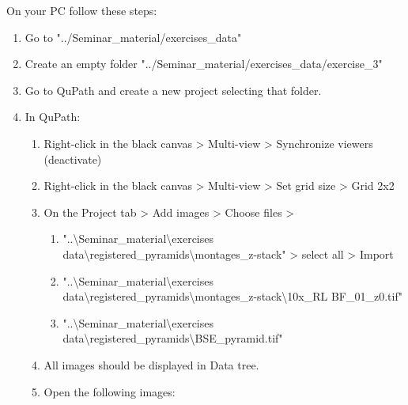 	On your PC follow these steps:
	
	\begin{enumerate}
		\def\labelenumi{\arabic{enumi}.}
		\item
		Go to "../Seminar\_material/exercises\_data"
		\item
		Create an empty folder "../Seminar\_material/exercises\_data/exercise\_3"
		\item
		Go to QuPath and create a new project selecting that folder.
		\item
		In QuPath:
		
		\begin{enumerate}
			\def\labelenumii{\alph{enumii}.}
			\item
			Right-click in the black canvas \textgreater{} Multi-view \textgreater{} Synchronize viewers (deactivate)
			\item
			Right-click in the black canvas \textgreater{} Multi-view \textgreater{} Set grid size \textgreater{} Grid 2x2
			\item
			On the Project tab \textgreater{} Add images \textgreater{} Choose files \textgreater{}
			
			\begin{enumerate}
				\def\labelenumiii{\roman{enumiii}.}
				\item
				"..\textbackslash Seminar\_material\textbackslash exercises data\textbackslash registered\_pyramids\textbackslash montages\_z-stack" \textgreater{} select all \textgreater{} Import
				\item
				"..\textbackslash Seminar\_material\textbackslash exercises data\textbackslash registered\_pyramids\textbackslash montages\_z-stack\textbackslash10x\_RL BF\_01\_z0.tif"
				\item
				"..\textbackslash Seminar\_material\textbackslash exercises data\textbackslash registered\_pyramids\textbackslash BSE\_pyramid.tif"
			\end{enumerate}
			\item
			All images should be displayed in Data tree.
			\item
			Open the following images:
			

\end{enumerate}
\end{enumerate}
